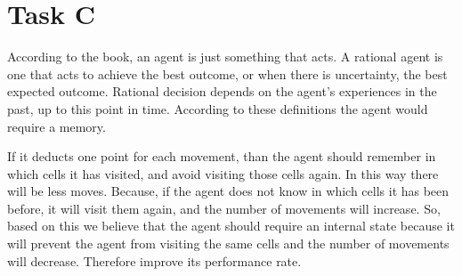
\section{Task C}

According to the book, an agent is just something that acts. A rational agent is
one that acts to achieve the best outcome, or when there is uncertainty,
the best expected outcome. Rational decision depends on the agent's experiences 
in the past, up to this point in time. According to these definitions the agent 
would require a memory.

If it deducts one point for each movement, than the agent should
remember in which cells it has visited, and avoid visiting those cells again. In
this way there will be less moves. Because, if the agent does not know in which 
cells it has been before, it will visit them again, and the number of movements 
will increase. So, based on this we believe that the agent should require an 
internal state because it will prevent the agent from visiting the same cells 
and the number of movements will decrease.  Therefore improve its performance
rate.

